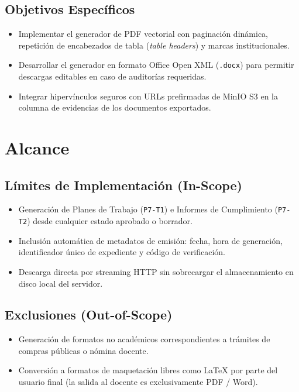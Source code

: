 \documentclass[12pt,a4paper]{article}
\begin{document}
\subsection{Objetivos Específicos}
\begin{itemize}[leftmargin=1.5em, itemsep=1.5pt]
    \item Implementar el generador de PDF vectorial con paginación dinámica, repetición de encabezados de tabla (\textit{table headers}) y marcas institucionales.
    \item Desarrollar el generador en formato Office Open XML (\texttt{.docx}) para permitir descargas editables en caso de auditorías requeridas.
    \item Integrar hipervínculos seguros con URLs prefirmadas de MinIO S3 en la columna de evidencias de los documentos exportados.
\end{itemize}

\section{Alcance}

\subsection{Límites de Implementación (In-Scope)}
\begin{itemize}[leftmargin=1.5em, itemsep=1.5pt]
    \item Generación de Planes de Trabajo (\texttt{P7-T1}) e Informes de Cumplimiento (\texttt{P7-T2}) desde cualquier estado aprobado o borrador.
    \item Inclusión automática de metadatos de emisión: fecha, hora de generación, identificador único de expediente y código de verificación.
    \item Descarga directa por streaming HTTP sin sobrecargar el almacenamiento en disco local del servidor.
\end{itemize}

\subsection{Exclusiones (Out-of-Scope)}
\begin{itemize}[leftmargin=1.5em, itemsep=1.5pt]
    \item Generación de formatos no académicos correspondientes a trámites de compras públicas o nómina docente.
    \item Conversión a formatos de maquetación libres como LaTeX por parte del usuario final (la salida al docente es exclusivamente PDF / Word).
\end{itemize}
\end{document}
